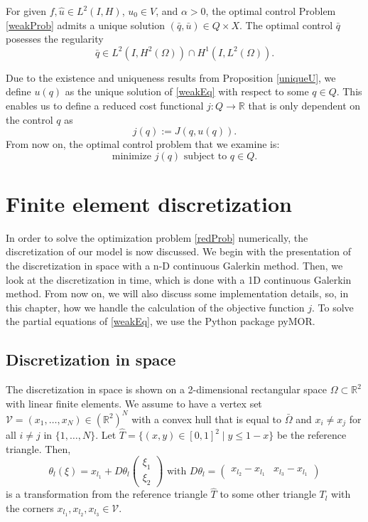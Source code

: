 \begin{prop}
For given $f,\hat{u}\in L^2(I,H)$, $u_0\in V$, and $\alpha>0$, the optimal control Problem \eqref{weakProb} admits a unique solution $(\bar{q},\bar{u})\in Q\times X$. The optimal control $\bar{q}$ posesses the regularity
\begin{displaymath}
\bar{q}\in L^2(I,H^2(\Omega))\cap H^1(I,L^2(\Omega)).
\end{displaymath}
\end{prop}

Due to the existence and uniqueness results from Proposition \ref{uniqueU}, we define $u(q)$ as the unique solution of \eqref{weakEq} with respect to some $q\in Q$. This enables us to define a reduced cost functional $j:Q\to \mathbb{R}$ that is only dependent on the control $q$ as
\begin{displaymath}
j(q):=J(q,u(q)).
\end{displaymath}
From now on, the optimal control problem that we examine is:
\begin{equation}
\label{redProb}
\text{minimize }j(q)\text{ subject to }q\in Q.
\end{equation}

\section{Finite element discretization}
In order to solve the optimization problem \eqref{redProb} numerically, the discretization of our model is now discussed. We begin with the presentation of the discretization in space with a n-D continuous Galerkin method. Then, we look at the discretization in time, which is done with a 1D continuous Galerkin method. From now on, we will also discuss some implementation details, so, in this chapter, how we handle the calculation of the objective function $j$. To solve the partial equations of \eqref{weakEq}, we use the Python package pyMOR.

\subsection{\label{SubsectionDiscretizationInSpace}Discretization in space}
The discretization in space is shown on a 2-dimensional rectangular space $\Omega\subset\mathbb{R}^2$ with linear finite elements. We assume to have a vertex set $\mathcal{V}=(x_1,\dotsc,x_N)\in(\mathbb{R}^2)^N$ with a convex hull that is equal  to $\bar{\Omega}$ and $x_i\neq x_j$ for all $i\neq j$ in $\{1,\dotsc,N\}$. Let $\hat{T}=\{(x,y)\in[0,1]^2\mid y \leq 1-x\}$ be the reference triangle. Then,
\begin{displaymath}
\theta_l(\xi)=x_{l_1} + D\theta_l \begin{pmatrix} \xi_1 \\ \xi_2 \end{pmatrix} \text{ with } D\theta_l = \begin{pmatrix} x_{l_2}-x_{l_1} & x_{l_3}-x_{l_1} \end{pmatrix}
\end{displaymath}
is a transformation from the reference triangle $\hat{T}$ to some other triangle $T_l$ with the corners $x_{l_1}, x_{l_2}, x_{l_3}\in\mathcal{V}$.

